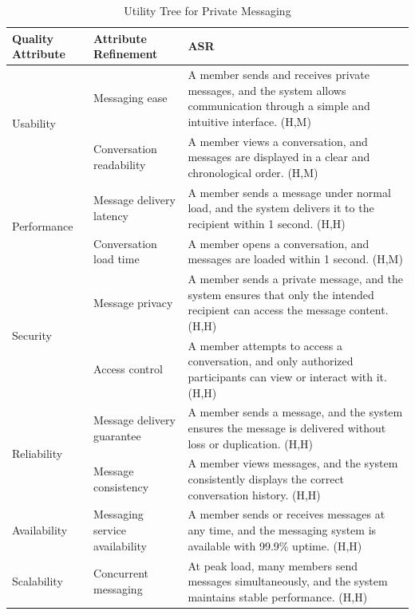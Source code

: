 \documentclass{article}
\begin{document}
\begin{table}[H]
\centering
\caption{Utility Tree for Private Messaging}
\begin{tabular}{|p{3cm}|p{4cm}|p{7cm}|}
\hline
\textbf{Quality Attribute} & \textbf{Attribute Refinement} & \textbf{ASR} \\
\hline

\multirow{2}{*}{Usability}
& Messaging ease
& A member sends and receives private messages, and the system allows communication through a simple and intuitive interface. (H,M) \\
\cline{2-3}
& Conversation readability
& A member views a conversation, and messages are displayed in a clear and chronological order. (H,M) \\
\hline

\multirow{2}{*}{Performance}
& Message delivery latency
& A member sends a message under normal load, and the system delivers it to the recipient within 1 second. (H,H) \\
\cline{2-3}
& Conversation load time
& A member opens a conversation, and messages are loaded within 1 second. (H,M) \\
\hline

\multirow{2}{*}{Security}
& Message privacy
& A member sends a private message, and the system ensures that only the intended recipient can access the message content. (H,H) \\
\cline{2-3}
& Access control
& A member attempts to access a conversation, and only authorized participants can view or interact with it. (H,H) \\
\hline

\multirow{2}{*}{Reliability}
& Message delivery guarantee
& A member sends a message, and the system ensures the message is delivered without loss or duplication. (H,H) \\
\cline{2-3}
& Message consistency
& A member views messages, and the system consistently displays the correct conversation history. (H,H) \\
\hline

Availability
& Messaging service availability
& A member sends or receives messages at any time, and the messaging system is available with 99.9\% uptime. (H,H) \\
\hline

Scalability
& Concurrent messaging
& At peak load, many members send messages simultaneously, and the system maintains stable performance. (H,H) \\
\hline


\end{tabular}
\end{table}
\end{document}
